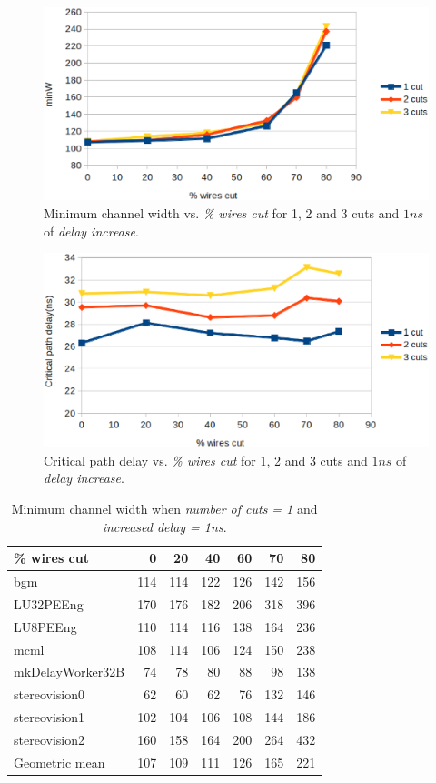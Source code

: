 \documentclass{sig-alternate-2013}
\begin{document}
\begin{figure}[!htbp]
\centering
\includegraphics[width=\linewidth]{cuts_minW.eps}
\caption{Minimum channel width vs. \textit{\% wires cut} for 1, 2 and 3 cuts and $1ns$ of \textit{delay increase}.}
\label{fig:cuts_minW}
\end{figure}

\begin{figure}[!htbp]
\centering
\includegraphics[width=\linewidth]{cuts_crit_path.eps}
\caption{Critical path delay vs. \textit{\% wires cut} for 1, 2 and 3 cuts and $1ns$ of \textit{delay increase}.}
\label{fig:cuts_crit}
\end{figure}

\begin{table}[!htbp]
\begin{tabular}{|l|r|r|r|r|r|r|}
\hline
\% wires cut & 0 & 20 & 40 & 60 & 70 & 80 \\ \hline \hline
bgm & 114 & 114 & 122 & 126 & 142 & 156 \\ \hline
LU32PEEng & 170 & 176 & 182 & 206 & 318 & 396 \\ \hline
LU8PEEng & 110 & 114 & 116 & 138 & 164 & 236 \\ \hline
mcml & 108 & 114 & 106 & 124 & 150 & 238 \\ \hline
mkDelayWorker32B & 74 & 78 & 80 & 88 & 98 & 138 \\ \hline
stereovision0 & 62 & 60 & 62 & 76 & 132 & 146 \\ \hline
stereovision1 & 102 & 104 & 106 & 108 & 144 & 186 \\ \hline
stereovision2 & 160 & 158 & 164 & 200 & 264 & 432 \\ \hline
Geometric mean & 107 & 109 & 111 & 126 & 165 & 221 \\ \hline
\end{tabular}
\caption{Minimum channel width when \textit{number of cuts = 1} and \textit{increased delay = 1ns}.}
\label{table:1cut_minW}
\end{table}
\end{document}
